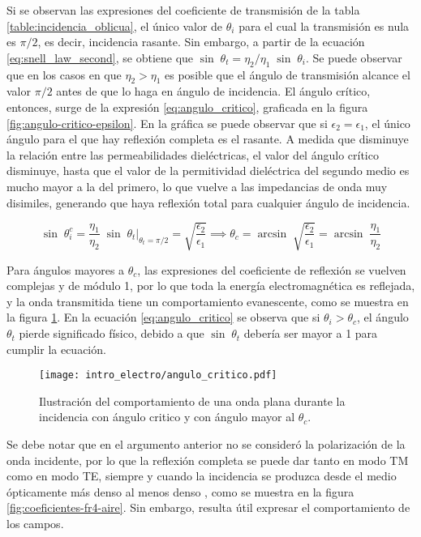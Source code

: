 Si se observan las expresiones del coeficiente de transmisión de la tabla \ref{table:incidencia_oblicua}, el único valor de $\theta_i$ para el cual la transmisión es nula es $\pi/2$, es decir, incidencia rasante. Sin embargo, a partir de la ecuación \ref{eq:snell_law_second}, se obtiene que $\sin \; \theta_t = \eta_2 / \eta_1\; \sin\; \theta_i$. Se puede observar que en los casos en que $\eta_2 > \eta_1$ es posible que el ángulo de transmisión alcance el valor $\pi/2$ antes de que lo haga en ángulo de incidencia. El ángulo crítico, entonces, surge de la expresión \ref{eq:angulo_critico}, graficada en la figura \ref{fig:angulo-critico-epsilon}. En la gráfica se puede observar que si $\epsilon_2 = \epsilon_1$, el único ángulo para el que hay reflexión completa es el rasante. A medida que disminuye la relación entre las permeabilidades dieléctricas, el valor del ángulo crítico disminuye, hasta que el valor de la permitividad dieléctrica del segundo medio es mucho mayor a la del primero, lo que vuelve a las impedancias de onda muy disimiles, generando que haya reflexión total para cualquier ángulo de incidencia.

\begin{equation}
	\label{eq:angulo_critico}
	\sin\; \theta_i^c = \frac{\eta_1}{\eta_2}\;\sin \; \theta_t|_{\theta_t=\pi/2} = \sqrt{\frac{\epsilon_2}{\epsilon_1}} \implies \theta_c = \arcsin \;\sqrt{\frac{\epsilon_2}{\epsilon_1}} = \arcsin \;\frac{\eta_1}{\eta_2}
\end{equation}

Para ángulos mayores a $\theta_c$, las expresiones del coeficiente de reflexión se vuelven complejas y de módulo 1, por lo que toda la energía electromagnética es reflejada, y la onda transmitida tiene un comportamiento evanescente, como se muestra en la figura \ref{fig:angulo_critico}. En la ecuación \ref{eq:angulo_critico} se observa que si $\theta_i > \theta_c$, el ángulo $\theta_t$ pierde significado físico, debido a que $\sin\; \theta_t$ debería ser mayor a 1 para cumplir la ecuación.

\begin{figure}[htp]
	\centering
	\texttt{[image: intro\_electro/angulo\_critico.pdf]}
	\caption{Ilustración del comportamiento de una onda plana durante la incidencia con ángulo critico y con ángulo mayor al $\theta_c$.}
	\label{fig:angulo_critico}
\end{figure}

Se debe notar que en el argumento anterior no se consideró la polarización de la onda incidente, por lo que la reflexión completa se puede dar tanto en modo TM como en modo TE, siempre y cuando la incidencia se produzca desde el medio ópticamente más denso al menos denso \cite{Fernandez:Electromag}, como se muestra en la figura \ref{fig:coeficientes-fr4-aire}. Sin embargo, resulta útil expresar el comportamiento de los campos.

